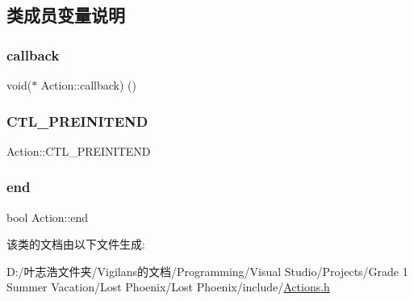 \subsection{类成员变量说明}
\mbox{\label{class_action_aef6c7c00b09ea1b0ddd7a26926309717}} 
\subsubsection{\texorpdfstring{callback}{callback}}
{\footnotesize\ttfamily void($\ast$ Action\+::callback) ()}

\mbox{\label{class_action_a682e7ba0a9ef3f891382df776c1ce883}} 
\subsubsection{\texorpdfstring{C\+T\+L\+\_\+\+P\+R\+E\+I\+N\+I\+T\+E\+ND}{CTL\_PREINITEND}}
{\footnotesize\ttfamily Action\+::\+C\+T\+L\+\_\+\+P\+R\+E\+I\+N\+I\+T\+E\+ND}

\mbox{\label{class_action_a28332e6535d45661d768bb1b321f4715}} 
\subsubsection{\texorpdfstring{end}{end}}
{\footnotesize\ttfamily bool Action\+::end}



该类的文档由以下文件生成\+:\begin{DoxyCompactItemize}
\item 
D\+:/叶志浩文件夹/\+Vigilans的文档/\+Programming/\+Visual Studio/\+Projects/\+Grade 1 Summer Vacation/\+Lost Phoenix/\+Lost Phoenix/include/\hyperlink{_actions_8h}{Actions.\+h}\end{DoxyCompactItemize}
